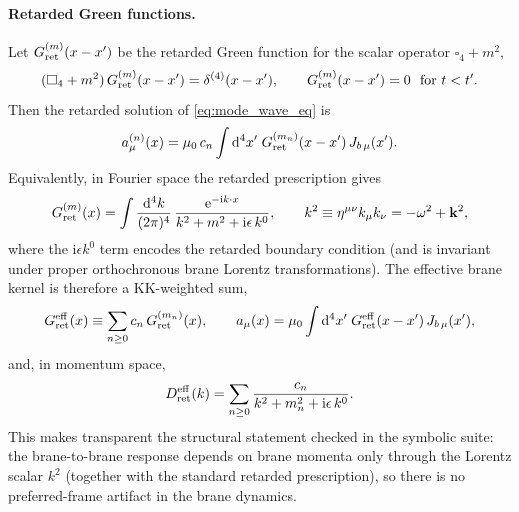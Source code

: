 \documentclass[11pt]{article}
\newcommand{\dd}{\mathrm d}
\newcommand{\ii}{\mathrm i}
\newcommand{\ee}{\mathrm e}
\newcommand{\J}{J}
\newcommand{\muo}{\mu_0}
\begin{document}
\paragraph{Retarded Green functions.}
Let \(G^{(m)}_{\rm ret}(x-x')\) be the retarded Green function for the scalar
operator \(\square_4+m^2\),
\begin{equation}
  (\square_4+m^2)\,G^{(m)}_{\rm ret}(x-x')=\delta^{(4)}(x-x'),
  \qquad
  G^{(m)}_{\rm ret}(x-x')=0\ \ \text{for}\ t<t'.
  \label{eq:Green_def}
\end{equation}
Then the retarded solution of \cref{eq:mode_wave_eq} is
\begin{equation}
  a^{(n)}_\mu(x)
  = \muo\,c_n \int \dd^4x'\; G^{(m_n)}_{\rm ret}(x-x')\,\J_{b\,\mu}(x').
  \label{eq:mode_retarded_solution}
\end{equation}
Equivalently, in Fourier space the retarded prescription gives
\begin{equation}
  G^{(m)}_{\rm ret}(x)
  = \int\frac{\dd^4k}{(2\pi)^4}\,
    \frac{\ee^{-\ii k\cdot x}}{k^2+m^2+\ii\epsilon\,k^0},
  \qquad
  k^2\equiv \eta^{\mu\nu}k_\mu k_\nu=-\omega^2+\mathbf{k}^2,
  \label{eq:Green_retarded_fourier}
\end{equation}
where the \(\ii\epsilon k^0\) term encodes the retarded boundary condition (and is
invariant under proper orthochronous brane Lorentz transformations). The effective
brane kernel is therefore a KK-weighted sum,
\begin{equation}
  G^{\rm eff}_{\rm ret}(x)
  \equiv \sum_{n\ge 0} c_n\,G^{(m_n)}_{\rm ret}(x),
  \qquad
  a_\mu(x)=\muo\int \dd^4x'\;G^{\rm eff}_{\rm ret}(x-x')\,\J_{b\,\mu}(x'),
  \label{eq:Geff_def}
\end{equation}
and, in momentum space,
\begin{equation}
  D^{\rm eff}_{\rm ret}(k)
  = \sum_{n\ge 0}\frac{c_n}{k^2+m_n^2+\ii\epsilon\,k^0}.
  \label{eq:Deff_retarded}
\end{equation}
This makes transparent the structural statement checked in the symbolic suite:
the brane-to-brane response depends on brane momenta only through the Lorentz
scalar \(k^2\) (together with the standard retarded prescription), so there is no
preferred-frame artifact in the brane dynamics.
\end{document}
